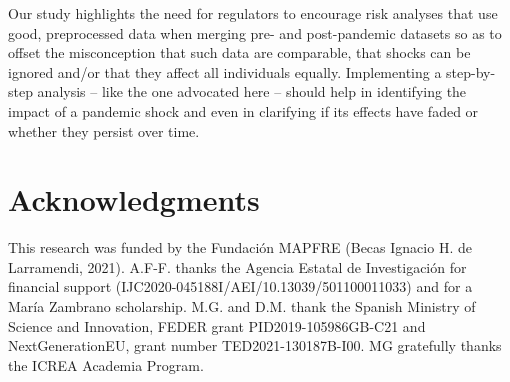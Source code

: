 \documentclass[]{risa}
\begin{document}
Our study highlights the need for regulators to encourage risk analyses that use good, preprocessed data when merging pre- and post-pandemic datasets so as to offset the misconception that such data are comparable, that shocks can be ignored and/or that they affect all individuals equally. Implementing a step-by-step analysis – like the one advocated here – should help in identifying the impact of a pandemic shock and even in clarifying if its effects have faded or whether they persist over time.


\backmatter

\section*{Acknowledgments}
This research was funded by the Fundación MAPFRE (Becas Ignacio H. de Larramendi, 2021). A.F-F. thanks the Agencia Estatal de Investigación for financial support (IJC2020-045188I/AEI/10.13039/501100011033) and for a María Zambrano scholarship. M.G. and D.M. thank the Spanish Ministry of Science and Innovation, FEDER grant PID2019-105986GB-C21 and NextGenerationEU, grant number TED2021-130187B-I00. MG gratefully thanks the ICREA Academia Program.



\end{document}
